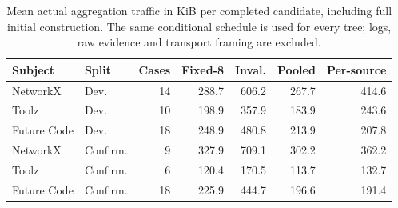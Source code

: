 \begin{table}[t]
\centering\small
\caption{Mean actual aggregation traffic in KiB per completed candidate, including full initial construction. The same conditional schedule is used for every tree; logs, raw evidence and transport framing are excluded.}\label{tab:traffic}
\begin{tabular}{@{}llrrrrr@{}}
\toprule
Subject & Split & Cases & Fixed-8 & Inval. & Pooled & Per-source\\
\midrule
NetworkX & Dev. & 14 & 288.7 & 606.2 & 267.7 & 414.6\\
Toolz & Dev. & 10 & 198.9 & 357.9 & 183.9 & 243.6\\
Future Code & Dev. & 18 & 248.9 & 480.8 & 213.9 & 207.8\\
NetworkX & Confirm. & 9 & 327.9 & 709.1 & 302.2 & 362.2\\
Toolz & Confirm. & 6 & 120.4 & 170.5 & 113.7 & 132.7\\
Future Code & Confirm. & 18 & 225.9 & 444.7 & 196.6 & 191.4\\
\bottomrule
\end{tabular}
\end{table}
